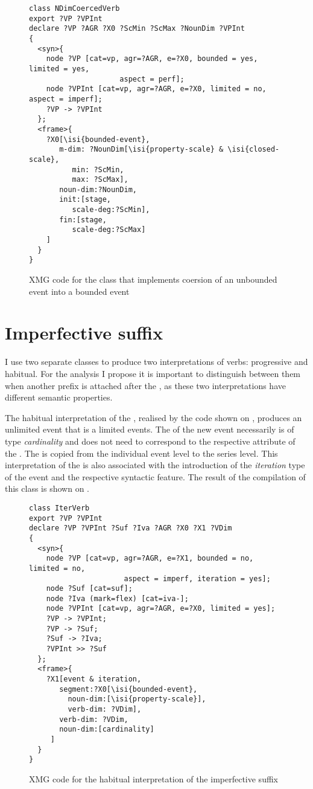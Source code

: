 \begin{figure}
\begin{lstlisting}[style=xmg]
class NDimCoercedVerb
export ?VP ?VPInt
declare ?VP ?AGR ?X0 ?ScMin ?ScMax ?NounDim ?VPInt
{
  <syn>{
    node ?VP [cat=vp, agr=?AGR, e=?X0, bounded = yes, limited = yes, 
    				 aspect = perf];
    node ?VPInt [cat=vp, agr=?AGR, e=?X0, limited = no, aspect = imperf];
    ?VP -> ?VPInt
  };
  <frame>{
    ?X0[\isi{bounded-event},
       m-dim: ?NounDim[\isi{property-scale} & \isi{closed-scale},
          min: ?ScMin,
          max: ?ScMax],
       noun-dim:?NounDim,
       init:[stage, 
          scale-deg:?ScMin],
       fin:[stage, 
          scale-deg:?ScMax]
    ]
  }
}
\end{lstlisting}
\caption{XMG code for the class that implements coersion of an unbounded event into a bounded event\label{xmg:coersion}}
\end{figure}

\section{Imperfective suffix}
I use two separate classes to produce two interpretations of  verbs: progressive and habitual. For the analysis I propose it is important to distinguish between them when another prefix is attached after the , as these two interpretations have different semantic properties.

The habitual interpretation of the , realised by the code shown on , produces an unlimited event that is a  limited events. The \NOUNDIM of the new event necessarily is of type \textit{cardinality} and does not need to correspond to the respective attribute of the . The  is copied from the individual event level to the series level. This interpretation of the  is also associated with the introduction of the \textit{iteration} type of the event and the respective syntactic feature. The result of the compilation of this class is shown on .

\begin{figure}
\begin{lstlisting}[style=xmg]
class IterVerb
export ?VP ?VPInt
declare ?VP ?VPInt ?Suf ?Iva ?AGR ?X0 ?X1 ?VDim
{
  <syn>{
    node ?VP [cat=vp, agr=?AGR, e=?X1, bounded = no, limited = no, 
    				  aspect = imperf, iteration = yes];
    node ?Suf [cat=suf];
    node ?Iva (mark=flex) [cat=iva-];
    node ?VPInt [cat=vp, agr=?AGR, e=?X0, limited = yes];
    ?VP -> ?VPInt;
    ?VP -> ?Suf;
    ?Suf -> ?Iva;
    ?VPInt >> ?Suf
  };
  <frame>{
    ?X1[event & iteration,
       segment:?X0[\isi{bounded-event},
         noun-dim:[\isi{property-scale}],
         verb-dim: ?VDim],
       verb-dim: ?VDim,
       noun-dim:[cardinality] 
     ]
  }
}
\end{lstlisting}
\caption{XMG code for the habitual interpretation of the imperfective suffix \label{xmg:habitual}}
\end{figure}


